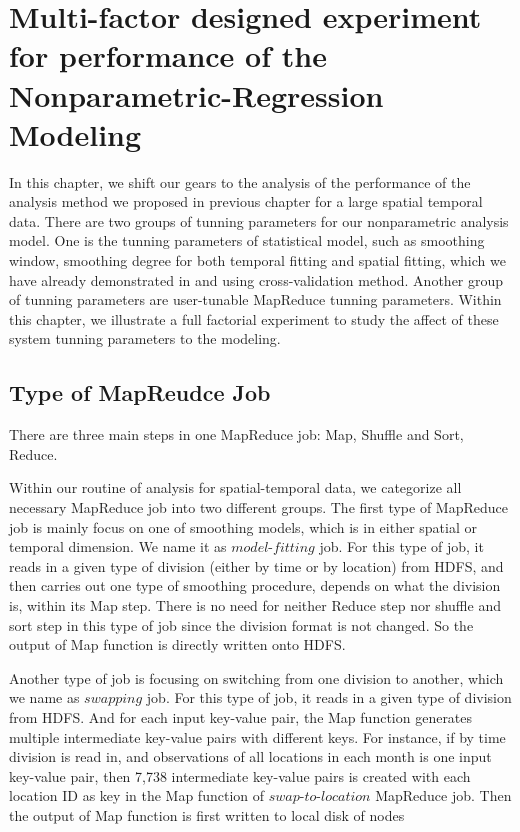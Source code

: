 \chapter{Multi-factor designed experiment for performance of the 
Nonparametric-Regression Modeling}

In this chapter, we shift our gears to the analysis of the performance of the 
analysis method we proposed in previous chapter for a large spatial temporal data.
There are two groups of tunning parameters for our nonparametric analysis model.
One is the tunning parameters of statistical model, such as smoothing window, 
smoothing degree for both temporal fitting and spatial fitting, which we have
already demonstrated in \cite{} and \cite{} using cross-validation method. Another
group of tunning parameters are user-tunable MapReduce tunning parameters. Within
this chapter, we illustrate a full factorial experiment to study the affect of
these system tunning parameters to the modeling.

\section{Type of MapReudce Job}

There are three main steps in one MapReduce job: Map, Shuffle and Sort, Reduce.

Within our routine of analysis for spatial-temporal data, we categorize all 
necessary MapReduce job into two different groups. The first type of MapReduce
job is mainly focus on one of smoothing models, which is in either spatial or 
temporal dimension. We name it as $model$-$fitting$ job. For this type of job, it 
reads in a given type of division (either by time or by location) from HDFS, and 
then carries out one type of smoothing procedure, depends on what the division is,
within its Map step. There is no need for neither Reduce step nor shuffle and sort
step in this type of job since the division format is not changed. So the output 
of Map function is directly written onto HDFS.

Another type of job is focusing on switching from one division to another, which
we name as $swapping$ job. For this type of job, it reads in a given type of 
division from HDFS. And for each input key-value pair, the Map function generates
multiple intermediate key-value pairs with different keys. For instance, if by 
time division is read in, and observations of all locations in each month is one 
input key-value pair, then 7,738 intermediate key-value pairs is created with each
location ID as key in the Map function of $swap$-$to$-$location$ MapReduce job.
Then the output of Map function is first written to local disk of nodes 

